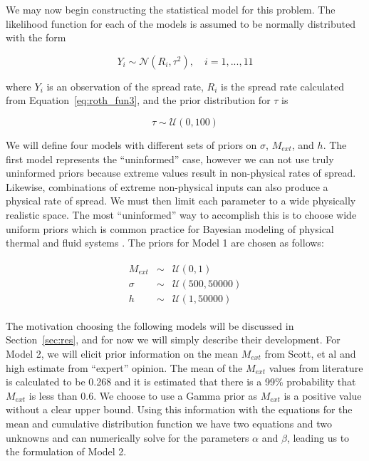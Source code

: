 \documentclass[11pt]{article}
\begin{document}
We may now begin constructing the statistical model for this problem. The likelihood function for each of the models is assumed to be normally distributed with the form

\begin{equation}
Y_i \sim \mathcal{N}(R_i,\tau^2),\quad i = 1,...,11
\label{eq:like}
\end{equation}

\noindent where $Y_i$ is an observation of the spread rate, $R_i$ is the spread rate calculated from Equation~\ref{eq:roth_fun3}, and the prior distribution for $\tau$ is

\begin{equation}
\tau \sim \mathcal{U}(0,100)
\label{eq:tau_prior}
\end{equation}

We will define four models with different sets of priors on $\sigma$, $M_{ext}$, and $h$. The first model represents the ``uninformed'' case, however we can not use truly uninformed priors because extreme values result in non-physical rates of spread. Likewise, combinations of extreme non-physical inputs can also produce a physical rate of spread. We must then limit each parameter to a wide physically realistic space. The most ``uninformed'' way to accomplish this is to choose wide uniform priors which is common practice for Bayesian modeling of physical thermal and fluid systems \cite{miki2012bayesian,cheung2011bayesian}. The priors for Model 1 are chosen as follows:

\begin{align}
\begin{array}{ccc}
M_{ext} &\sim& \mathcal{U}(0,1) \\
\sigma &\sim& \mathcal{U}(500,50000) \\
h &\sim& \mathcal{U}(1,50000)
\end{array}
\label{eq:mod1_priors}
\end{align}

The motivation choosing the following models will be discussed in Section~\ref{sec:res}, and for now we will simply describe their development. For Model 2, we will elicit prior information on the mean $M_{ext}$ from Scott, et al \cite{scott2005standard} and high estimate from ``expert'' opinion. The mean of the $M_{ext}$ values from literature is calculated to be 0.268 and it is estimated that there is a 99\% probability that $M_{ext}$ is less than 0.6. We choose to use a Gamma prior as $M_{ext}$ is a positive value without a clear upper bound. Using this information with the equations for the mean and cumulative distribution function we have two equations and two unknowns and can numerically solve for the parameters $\alpha$ and $\beta$, leading us to the formulation of Model 2.
\end{document}
